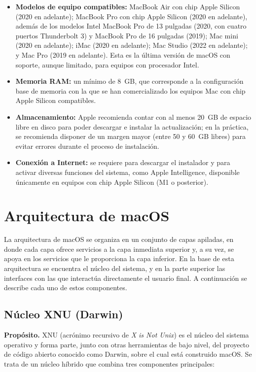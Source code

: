 \documentclass[12pt,letterpaper]{article}
\begin{document}
\begin{itemize}[nosep]
    \item \textbf{Modelos de equipo compatibles:} MacBook Air con chip Apple Silicon (2020 en adelante); MacBook Pro con chip Apple Silicon (2020 en adelante), además de los modelos Intel MacBook Pro de 13 pulgadas (2020, con cuatro puertos Thunderbolt 3) y MacBook Pro de 16 pulgadas (2019); Mac mini (2020 en adelante); iMac (2020 en adelante); Mac Studio (2022 en adelante); y Mac Pro (2019 en adelante). Esta es la última versión de macOS con soporte, aunque limitado, para equipos con procesador Intel.
    \item \textbf{Memoria RAM:} un mínimo de 8~GB, que corresponde a la configuración base de memoria con la que se han comercializado los equipos Mac con chip Apple Silicon compatibles.
    \item \textbf{Almacenamiento:} Apple recomienda contar con al menos 20~GB de espacio libre en disco para poder descargar e instalar la actualización; en la práctica, se recomienda disponer de un margen mayor (entre 50 y 60~GB libres) para evitar errores durante el proceso de instalación.
    \item \textbf{Conexión a Internet:} se requiere para descargar el instalador y para activar diversas funciones del sistema, como Apple Intelligence, disponible únicamente en equipos con chip Apple Silicon (M1 o posterior).
\end{itemize}

\section{Arquitectura de macOS}

La arquitectura de macOS se organiza en un conjunto de capas apiladas, en donde cada capa ofrece servicios a la capa inmediata superior y, a su vez, se apoya en los servicios que le proporciona la capa inferior. En la base de esta arquitectura se encuentra el núcleo del sistema, y en la parte superior las interfaces con las que interactúa directamente el usuario final. A continuación se describe cada uno de estos componentes.

\subsection{Núcleo XNU (Darwin)}

\textbf{Propósito.} XNU (acrónimo recursivo de \textit{X is Not Unix}) es el núcleo del sistema operativo y forma parte, junto con otras herramientas de bajo nivel, del proyecto de código abierto conocido como Darwin, sobre el cual está construido macOS. Se trata de un núcleo híbrido que combina tres componentes principales:
\end{document}
